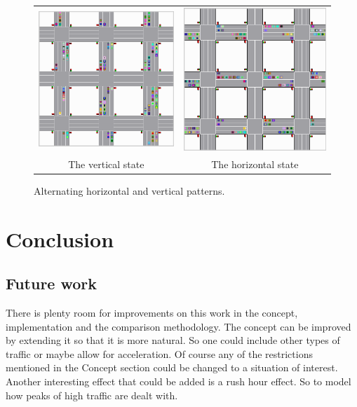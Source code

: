 \documentclass[a4paper,11pt]{article}
\begin{document}
\begin{figure}[H]
  \centering
  \begin{tabular}{cc}
  \includegraphics[width=.45\linewidth]{img/vertical.png} & \includegraphics[width=.45\linewidth]{img/horizontal.png}\\
  The vertical state & The horizontal state\\
  \end{tabular}
  \caption{Alternating horizontal and vertical patterns.}
  \label{fig:pattern}
\end{figure}

\section{Conclusion}\label{sec:conclusion}


\subsection{Future work}

There is plenty room for improvements on this work in the concept, implementation and the comparison methodology.
The concept can be improved by extending it so that it is more natural.
So one could include other types of traffic or maybe allow for acceleration.
Of course any of the restrictions mentioned in the Concept section could be changed to a situation of interest.
Another interesting effect that could be added is a rush hour effect.
So to model how peaks of high traffic are dealt with.\\
\end{document}
